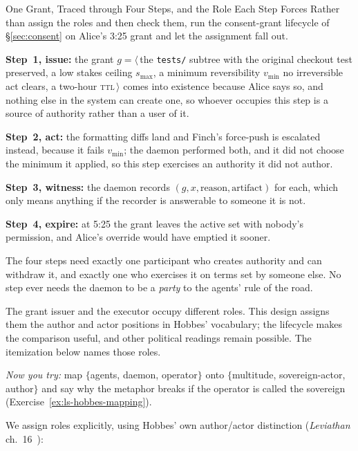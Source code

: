 \documentclass[11pt,a4paper]{article}
\theoremstyle{definition}
\theoremstyle{plain}
\begin{document}
\begin{pdexample}{One Grant, Traced through Four Steps, and the Role Each Step Forces}
\setlength{\parskip}{4pt plus 1pt}
Rather than assign the roles and then check them, run the consent-grant lifecycle of \S\ref{sec:consent} on Alice's 3:25 grant and let the assignment fall out.

\textbf{Step~1, issue:} the grant $g = \langle$\,the \texttt{tests/} subtree with the original checkout test preserved, a low stakes ceiling $s_{\max}$, a minimum reversibility $v_{\min}$ no irreversible act clears, a two-hour \textsc{ttl}\,$\rangle$ comes into existence because Alice says so, and nothing else in the system can create one, so whoever occupies this step is a source of authority rather than a user of it.

\textbf{Step~2, act:} the formatting diffs land and Finch's force-push is escalated instead, because it fails $v_{\min}$; the daemon performed both, and it did not choose the minimum it applied, so this step exercises an authority it did not author.

\textbf{Step~3, witness:} the daemon records $(g, x, \text{reason}, \text{artifact})$ for each, which only means anything if the recorder is answerable to someone it is not.

\textbf{Step~4, expire:} at 5:25 the grant leaves the active set with nobody's permission, and Alice's override would have emptied it sooner.

The four steps need exactly one participant who creates authority and can withdraw it, and exactly one who exercises it on terms set by someone else. No step ever needs the daemon to be a \emph{party} to the agents' rule of the road.

The grant issuer and the executor occupy different roles. This design assigns
them the author and actor positions in Hobbes' vocabulary; the lifecycle makes
the comparison useful, and other political readings remain possible. The itemization below names those roles.

\emph{Now you try:} map $\{$agents, daemon, operator$\}$ onto $\{$multitude, sovereign-actor, author$\}$ and say why the metaphor breaks if the operator is called the sovereign (Exercise~\ref{ex:ls-hobbes-mapping}).
\end{pdexample}

We assign roles explicitly, using Hobbes' own
author/actor distinction (\emph{Leviathan} ch.~16~):
\end{document}
